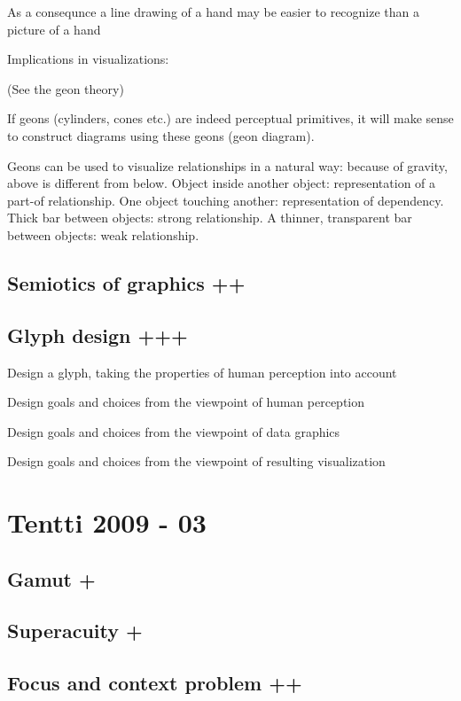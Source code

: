 \documentclass[a4paper]{article}
\begin{document}
As a consequnce a line drawing of a hand may be easier to recognize than a picture of a hand

Implications in visualizations:

(See the geon theory)

If geons (cylinders, cones etc.) are indeed perceptual primitives, it will make sense to construct diagrams using these geons (geon diagram). 

Geons can be used to visualize relationships in a natural way: because of gravity, above is different from below. Object inside another object: representation of a part-of relationship. One object touching another: representation of dependency. Thick bar between objects: strong relationship. A thinner, transparent bar between objects: weak relationship.

\subsection{Semiotics of graphics ++}

\subsection{Glyph design +++}

Design a glyph, taking the properties of human perception into account

Design goals and choices from the viewpoint of human perception

Design goals and choices from the viewpoint of data graphics

Design goals and choices from the viewpoint of resulting visualization



\section{Tentti 2009 - 03}

\subsection{Gamut +}

\subsection{Superacuity +}

\subsection{Focus and context problem ++}
\end{document}
